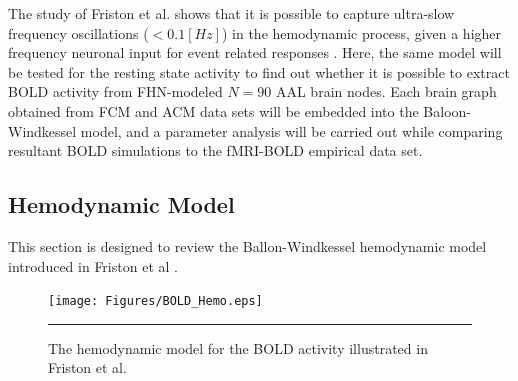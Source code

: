 The study of Friston et al. shows that it is possible to capture ultra-slow frequency oscillations ($<0.1[Hz]$) in the hemodynamic process, given a higher frequency neuronal input for event related responses \citep{FRI00}. Here, the same model will be tested for the resting state activity to find out whether it is possible to extract BOLD activity from FHN-modeled $N=90$ AAL brain nodes. Each brain graph obtained from FCM and ACM data sets will be embedded into the Baloon-Windkessel model, and a parameter analysis will be carried out while comparing resultant BOLD simulations to the fMRI-BOLD empirical data set.

  

\subsection{Hemodynamic Model}

This section is designed to review the Ballon-Windkessel hemodynamic model introduced in Friston et al \citep{FRI00}.  


\begin{figure}[htbp]
  \centering
	\texttt{[image: Figures/BOLD\_Hemo.eps]}
 	\rule{35em}{0.5pt}
    \caption[Hemodynamic Model]{The hemodynamic model for the BOLD activity illustrated in Friston et al. \citep{FRI00}  }
  \label{fig:Hemodynamic Model}	
\end{figure}


